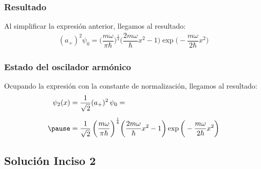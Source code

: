 \documentclass[12pt]{beamer}
\begin{document}
\begin{frame}
\frametitle{Resultado}
Al simplificar la expresión anterior, llegamos al resultado:
\pause
\begin{align*}
(a_{+})^{2} \psi_{0} = \bigg( \dfrac{m \omega}{\pi \hbar} \bigg)^{\frac{1}{4}} \bigg( \dfrac{2 m \omega}{\hbar} x^{2} - 1 \bigg) \exp\bigg(- \dfrac{m \omega}{2 \hbar} x^{2} \bigg)
\end{align*}
\end{frame}
\begin{frame}
\frametitle{Estado del oscilador armónico}
Ocupando la expresión con la constante de normalización, llegamos al resultado:
\pause
\begin{eqnarray*}
\begin{aligned}
\psi_{2} (x) &= \dfrac{1}{\sqrt{2}} (a_{+})^{2} \, \psi_{0} = \\[0.5em] \pause
&= \dfrac{1}{\sqrt{2}} \, \bigg( \dfrac{m \omega}{\pi \hbar} \bigg)^{\frac{1}{4}} \bigg( \dfrac{2 m \omega}{\hbar} x^{2} - 1 \bigg) \exp\bigg(- \dfrac{m \omega}{2 \hbar} x^{2} \bigg)
\end{aligned}
\end{eqnarray*}
\end{frame}

\subsection{Solución Inciso 2}
\end{document}
